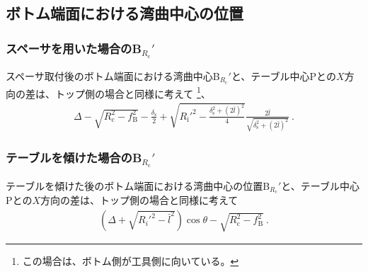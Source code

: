 \clearpage


\subsection{ボトム端面における湾曲中心の位置}

\subsubsection{スペーサを用いた場合のB\texorpdfstring{$_{R_\mathrm c}'$}{Rc'}}
スペーサ取付後のボトム端面における湾曲中心B$_{R_\mathrm c}'$と、テーブル中心Pとの$X$方向の差は、トップ側の場合と同様に考えて
\footnote{この場合は、ボトム側が工具側に向いている。}、
\begin{align*}
  \Delta-\sqrt{R_\mathrm c^2-f_\mathrm B^2}-\frac{\delta_\mathrm s}2
  +\sqrt{R_\mathrm i'^2-\frac{\delta_\mathrm s^2+(2\bar l)^2}4}\frac{2\bar l}{\sqrt{\delta_\mathrm s^2+(2\bar l)^2}}\ .
\end{align*}

\subsubsection{テーブルを傾けた場合のB\texorpdfstring{$_{R_\mathrm c}'$}{Rc'}}
テーブルを傾けた後のボトム端面における湾曲中心の位置B$_{R_\mathrm c}'$と、テーブル中心Pとの$X$方向の差は、トップ側の場合と同様に考えて
\begin{align*}
  \left(\Delta+\sqrt{R_i'^2-\bar l^2}\right)\cos\theta-\sqrt{R_\mathrm c^2-f_\mathrm B^2}~.
\end{align*}


